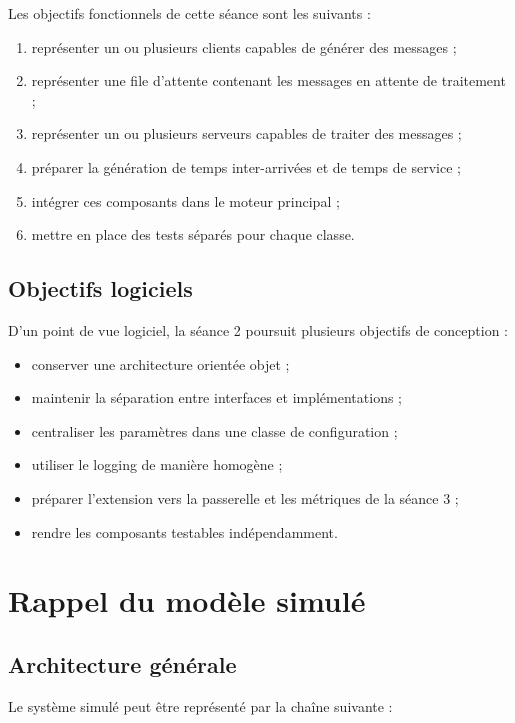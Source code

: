 \documentclass{article}
\begin{document}
Les objectifs fonctionnels de cette séance sont les suivants :
\begin{enumerate}[leftmargin=*]
    \item représenter un ou plusieurs clients capables de générer des messages ;
    \item représenter une file d’attente contenant les messages en attente de traitement ;
    \item représenter un ou plusieurs serveurs capables de traiter des messages ;
    \item préparer la génération de temps inter-arrivées et de temps de service ;
    \item intégrer ces composants dans le moteur principal ;
    \item mettre en place des tests séparés pour chaque classe.
\end{enumerate}

\subsection{Objectifs logiciels}

D’un point de vue logiciel, la séance 2 poursuit plusieurs objectifs de conception :
\begin{itemize}[leftmargin=*]
    \item conserver une architecture orientée objet ;
    \item maintenir la séparation entre interfaces et implémentations ;
    \item centraliser les paramètres dans une classe de configuration ;
    \item utiliser le logging de manière homogène ;
    \item préparer l’extension vers la passerelle et les métriques de la séance 3 ;
    \item rendre les composants testables indépendamment.
\end{itemize}

\section{Rappel du modèle simulé}

\subsection{Architecture générale}

Le système simulé peut être représenté par la chaîne suivante :
\end{document}
